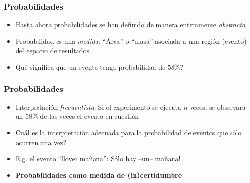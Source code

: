 \documentclass[xcolor=dvipsnames,10pt]{beamer}
\begin{document}
%
\begin{frame}
  \frametitle{Probabilidades}
  \begin{itemize}
  \item Hasta ahora probabilidades se han definido de manera enteramente \emph{abstracta}
  \item Probabilidad es una \emph{medida}: ``Área'' o ``masa'' asociada a una región (evento) del espacio de resultados
  \item Qué significa que un evento tenga probabilidad de $58 \%$?
  \end{itemize}
\end{frame}
%
\begin{frame}
  \frametitle{Probabilidades}
  \begin{itemize}
  \item Interpretación \emph{frecuentista}: Si el experimento se ejecuta $n$ veces, se observará un $58 \%$ de las veces el evento en cuestión
    \pause
  \item Cuál es la interpretación adecuada para la probabilidad de eventos que sólo ocurren una vez?
  \item E.g. el evento ``llover mañana'': Sólo hay --un-- mañana!
    \pause
  \item \textbf{Probabilidades como medida de (in)certidumbre}
  \end{itemize}
\end{frame}
%
\end{document}
